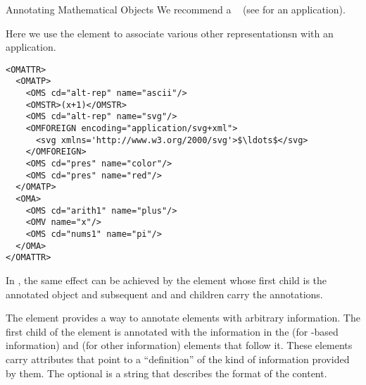 \begin{omgroup}[id=annotating]{Annotating Mathematical Objects}
We recommend a ~\cite{FreBor:MIME96} (see  for an
application).

\begin{example}[id=omattr.ex]
  Here we use the  element to associate various other
  representationsn with an application.
\begin{lstlisting}[language=OpenMath,label=lst:omattr,mathescape,
                   caption={Associating Alternate Representations with an
                   {\openmath} Object},
                   numbers=none,index={OMATTR,OMATP}]
<OMATTR>
  <OMATP>
    <OMS cd="alt-rep" name="ascii"/>
    <OMSTR>(x+1)</OMSTR>
    <OMS cd="alt-rep" name="svg"/>
    <OMFOREIGN encoding="application/svg+xml">
      <svg xmlns='http://www.w3.org/2000/svg'>$\ldots$</svg>
    </OMFOREIGN>
    <OMS cd="pres" name="color"/>
    <OMS cd="pres" name="red"/>
  </OMATP>
  <OMA>
    <OMS cd="arith1" name="plus"/>
    <OMV name="x"/>
    <OMS cd="nums1" name="pi"/>
  </OMA>
</OMATTR>
\end{lstlisting}
\end{example}

In \cmathml, the same effect can be achieved by the  element
whose first child is the annotated object and subsequent 
and  and children carry the annotations.

\begin{definition}[id=semantics.def]
  The  element provides a way to annotate {\cmathml} elements
  with arbitrary information. The first child of the  element
  is annotated with the information in the {} (for
  {\xml}-based information) and {} (for other information)
  elements that follow it. These elements carry
   attributes that point to a
  ``definition'' of the kind of information provided by them. The optional
   is a string that describes the format of the
  content.
\end{definition}


\end{omgroup}
